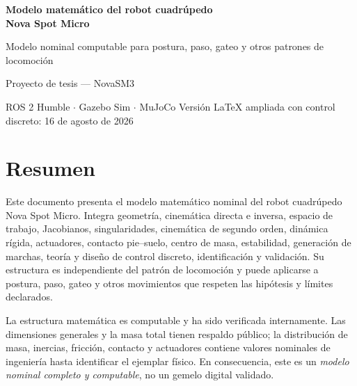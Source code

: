 \documentclass[11pt,letterpaper]{article}
\begin{document}
\hypersetup{pageanchor=false}
\begin{titlepage}
\centering
\vspace*{3cm}
{\Huge\bfseries\color{novaBlue} Modelo matemático del robot cuadrúpedo\\[0.3cm]
Nova Spot Micro\par}
\vspace{2cm}
{\Large Modelo nominal computable para postura, paso, gateo y otros patrones de locomoción\par}
\vfill
{\large Proyecto de tesis --- NovaSM3\par}
\vspace{1cm}
ROS 2 Humble $\cdot$ Gazebo Sim $\cdot$ MuJoCo
\vfill
Versión LaTeX ampliada con control discreto: 16 de agosto de 2026
\end{titlepage}

\tableofcontents
\clearpage
\hypersetup{pageanchor=true}

\section*{Resumen}
Este documento presenta el modelo matemático nominal del robot cuadrúpedo Nova
Spot Micro. Integra geometría, cinemática directa e inversa, espacio de trabajo,
Jacobianos, singularidades, cinemática de segundo orden, dinámica rígida,
actuadores, contacto pie--suelo, centro de masa, estabilidad, generación de
marchas, teoría y diseño de control discreto, identificación y validación. Su estructura es independiente del patrón
de locomoción y puede aplicarse a postura, paso, gateo y otros movimientos que
respeten las hipótesis y límites declarados.

\begin{validity}
La estructura matemática es computable y ha sido verificada internamente. Las
dimensiones generales y la masa total tienen respaldo público; la distribución
de masa, inercias, fricción, contacto y actuadores contiene valores nominales de
ingeniería hasta identificar el ejemplar físico. En consecuencia, este es un
\emph{modelo nominal completo y computable}, no un gemelo digital validado.
\end{validity}
\end{document}

